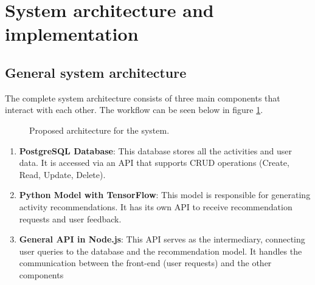 \documentclass[10pt,twocolumn,letterpaper]{article}
\begin{document}
\section{System architecture and implementation}
\subsection{General system architecture}

The complete system architecture consists of three main components that interact with each other. The workflow can be seen below in figure \ref{fig:architecture}. 

\begin{figure}
       \centering
       \caption{Proposed architecture for the system.}
       \label{fig:architecture}
\end{figure}

\begin{enumerate}
    \item \textbf{PostgreSQL Database}: This database stores all the activities and user data. It is accessed via an API that supports CRUD operations (Create, Read, Update, Delete).
    
    \item \textbf{Python Model with TensorFlow}: This model is responsible for generating activity recommendations. It has its own API to receive recommendation requests and user feedback.
    
    \item \textbf{General API in Node.js}: This API serves as the intermediary, connecting user queries to the database and the recommendation model. It handles the communication between the front-end (user requests) and the other components
\end{enumerate}
\end{document}
